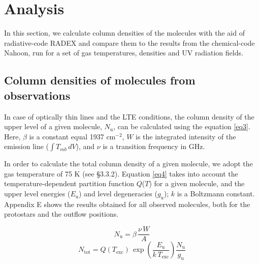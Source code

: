 \documentclass{aa}
\begin{document}
\section{Analysis}
In this section, we calculate column densities of the molecules with the aid 
of radiative-code RADEX and compare them to the results from the chemical-code Nahoon, 
run for a set of gas temperatures, densities and UV radiation fields. 
\subsection{Column densities of molecules from observations}

In case of optically thin lines and the LTE conditions, the column density of the 
upper level of a given molecule, $N_\mathrm{u}$, can be calculated using the equation \ref{eq3}. 
Here, $\beta$ is a constant equal 1937 cm$^{-2}$, $W$ is the integrated
intensity of the emission line ($\int{T_{mb} \, dV}$), and $\nu$ is a transition 
frequency in GHz. 

In order to calculate the total column density of a given molecule, 
we adopt the gas temperature of 75 K (see \S 3.3.2). Equation \ref{eq4} takes into account the 
temperature-dependent partition function $Q$($T$) for a given molecule, and 
the upper level energies ($E_\mathrm{u}$) and level degeneracies ($g_\mathrm{u}$);
$k$ is a Boltzmann constant. Appendix E shows the results obtained for all observed 
molecules, both for the protostars and the outflow positions.


\begin{equation} 
\label{eq3} N_\mathrm{u} = \beta \, \frac{\nu \,W}{A} 
\end{equation} 
\begin{equation} 
\label{eq4} N_\mathrm{tot} = Q(T_\mathrm{exc}) \, \exp(\frac{E_\mathrm{u}}{k \, T_\mathrm{exc}})  \frac{N_\mathrm{u} }{g_\mathrm{u} } 
\end{equation} 
\end{document}

